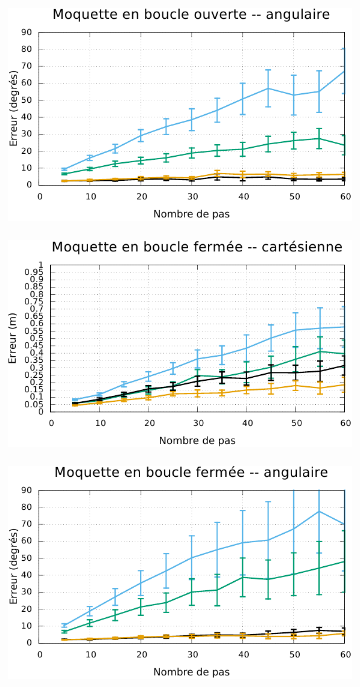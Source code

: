 \begin{figure}[htbp]
\begin{subfigure}{0.37\paperwidth}
    \end{subfigure}
    \begin{subfigure}{0.37\paperwidth}
        \centering
        \includegraphics[type=pdf,ext=.pdf,read=.pdf,width=1.0\linewidth]{../plot/OdometryLWPR/carpet_open_compare_angle}
    \end{subfigure}
    \newline
    \begin{subfigure}{0.37\paperwidth}
        \centering
        \includegraphics[type=pdf,ext=.pdf,read=.pdf,width=1.0\linewidth]{../plot/OdometryLWPR/carpet_close_compare_cart}
    \end{subfigure}
    \begin{subfigure}{0.37\paperwidth}
        \centering
        \includegraphics[type=pdf,ext=.pdf,read=.pdf,width=1.0\linewidth]{../plot/OdometryLWPR/carpet_close_compare_angle}

\end{subfigure}
\end{figure}
